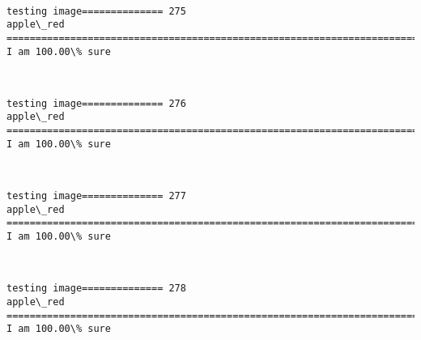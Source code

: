 \documentclass[11pt]{article}
\begin{document}
    \begin{center}
    \end{center}
    { \hspace*{\fill} \\}
    
    \begin{Verbatim}[commandchars=\\\{\}]
testing image============== 275
apple\_red
============================================================================
I am 100.00\% sure

    \end{Verbatim}

    \begin{center}
    \end{center}
    { \hspace*{\fill} \\}
    
    \begin{Verbatim}[commandchars=\\\{\}]
testing image============== 276
apple\_red
============================================================================
I am 100.00\% sure

    \end{Verbatim}

    \begin{center}
    \end{center}
    { \hspace*{\fill} \\}
    
    \begin{Verbatim}[commandchars=\\\{\}]
testing image============== 277
apple\_red
============================================================================
I am 100.00\% sure

    \end{Verbatim}

    \begin{center}
    \end{center}
    { \hspace*{\fill} \\}
    
    \begin{Verbatim}[commandchars=\\\{\}]
testing image============== 278
apple\_red
============================================================================
I am 100.00\% sure

    \end{Verbatim}
\end{document}
